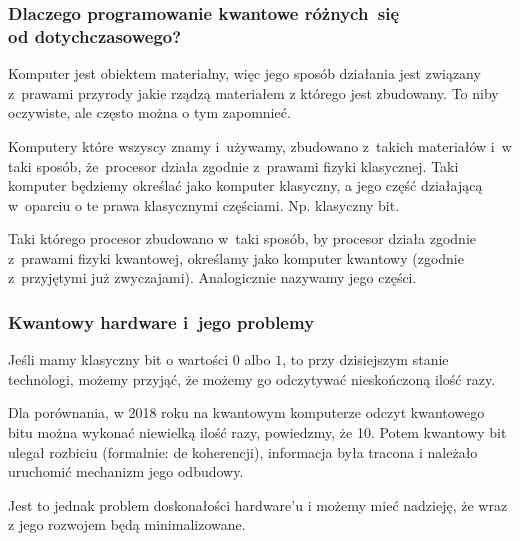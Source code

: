 \documentclass[10pt,t]{beamer}
\begin{document}
\begin{frame}
  \frametitle{Dlaczego programowanie kwantowe różnych~się \\
  od dotychczasowego?}


  Komputer jest obiektem materialny, więc jego sposób działania jest
  związany z~prawami przyrody jakie rządzą materiałem z którego jest
  zbudowany. To niby oczywiste, ale często można o tym zapomnieć.

  Komputery które wszyscy znamy i~używamy, zbudowano z~takich
  materiałów i~w taki sposób, że~procesor działa zgodnie z~prawami
  fizyki klasycznej. Taki komputer będziemy określać jako komputer
  klasyczny, a jego część działającą w~oparciu o te prawa
  klasycznymi częściami. Np. klasyczny bit.

  Taki którego procesor zbudowano w~taki sposób, by procesor działa
  zgodnie z~prawami fizyki kwantowej, określamy jako komputer
  kwantowy (zgodnie z~przyjętymi już zwyczajami). Analogicznie
  nazywamy jego części.

\end{frame}





\begin{frame}
  \frametitle{Kwantowy hardware i~jego problemy}


  Jeśli mamy klasyczny bit o wartości $0$ albo $1$, to przy
  dzisiejszym stanie technologi, możemy przyjąć, że możemy go
  odczytywać nieskończoną ilość razy.

  Dla porównania, w 2018 roku na kwantowym komputerze odczyt
  kwantowego bitu można wykonać niewielką ilość razy, powiedzmy, że 10. Potem kwantowy bit ulegał rozbiciu (formalnie: de
  koherencji), informacja była tracona i należało uruchomić mechanizm
  jego odbudowy.

  Jest to jednak problem doskonałości hardware'u i możemy mieć
  nadzieję, że wraz z jego rozwojem będą minimalizowane.

\end{frame}
\end{document}
